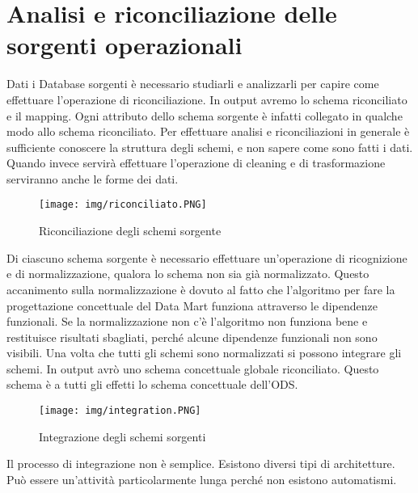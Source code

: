 
\section{Analisi e riconciliazione delle sorgenti operazionali}
Dati i Database sorgenti è necessario studiarli e analizzarli per capire come effettuare l'operazione di riconciliazione.\newline
In output avremo lo schema riconciliato e il mapping.
Ogni attributo dello schema sorgente è infatti collegato in qualche modo allo schema riconciliato.\newline
Per effettuare analisi e riconciliazioni in generale è sufficiente conoscere la struttura degli schemi, e non sapere come sono fatti i dati.\newline
Quando invece servirà effettuare l'operazione di cleaning e di trasformazione serviranno anche le forme dei dati.
\begin{figure}[H]
	\begin{center}
		\texttt{[image: img/riconciliato.PNG]}
		\caption{Riconciliazione degli schemi sorgente}
	\end{center}
\end{figure}
\noindent Di ciascuno schema sorgente è necessario effettuare un'operazione di ricognizione e di normalizzazione, qualora lo schema non sia già normalizzato. Questo accanimento sulla normalizzazione è dovuto al fatto che l'algoritmo per fare la progettazione concettuale del Data Mart funziona attraverso le dipendenze funzionali. Se la normalizzazione non c'è l'algoritmo non funziona bene e restituisce risultati sbagliati, perché alcune dipendenze funzionali non sono visibili.\newline
Una volta che tutti gli schemi sono normalizzati si possono integrare gli schemi. In output avrò uno schema concettuale globale riconciliato. Questo schema è a tutti gli effetti lo schema concettuale dell'ODS.\newline
\begin{figure}[H]
	\begin{center}
		\texttt{[image: img/integration.PNG]}
		\caption{Integrazione degli schemi sorgenti}
	\end{center}
\end{figure}

Il processo di integrazione non è semplice. Esistono diversi tipi di architetture. Può essere un'attività particolarmente lunga perché non esistono automatismi.


